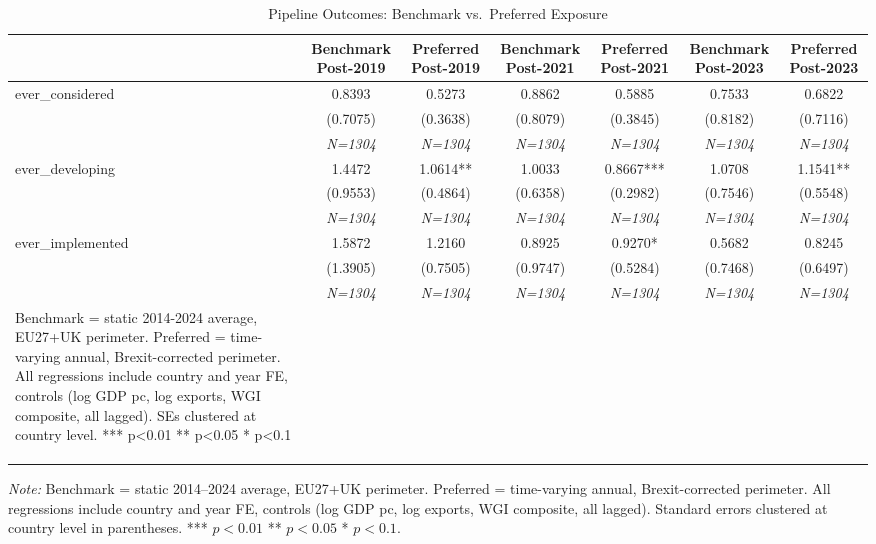 \documentclass[12pt,a4paper]{article}
\begin{document}
\begin{table}[htbp]
\centering
\begin{threeparttable}
\caption{Pipeline Outcomes: Benchmark vs.~Preferred Exposure}\label{tab:twfe_comparison}
\small
\begin{tabular}{lcccccc}
\toprule
 & Benchmark Post-2019 & Preferred Post-2019 & Benchmark Post-2021 & Preferred Post-2021 & Benchmark Post-2023 & Preferred Post-2023 \\
\midrule
ever\_considered & 0.8393 & 0.5273 & 0.8862 & 0.5885 & 0.7533 & 0.6822 \\
 & (0.7075) & (0.3638) & (0.8079) & (0.3845) & (0.8182) & (0.7116) \\
 & \textit{N=1304} & \textit{N=1304} & \textit{N=1304} & \textit{N=1304} & \textit{N=1304} & \textit{N=1304} \\
\addlinespace
ever\_developing & 1.4472 & 1.0614** & 1.0033 & 0.8667*** & 1.0708 & 1.1541** \\
 & (0.9553) & (0.4864) & (0.6358) & (0.2982) & (0.7546) & (0.5548) \\
 & \textit{N=1304} & \textit{N=1304} & \textit{N=1304} & \textit{N=1304} & \textit{N=1304} & \textit{N=1304} \\
\addlinespace
ever\_implemented & 1.5872 & 1.2160 & 0.8925 & 0.9270* & 0.5682 & 0.8245 \\
 & (1.3905) & (0.7505) & (0.9747) & (0.5284) & (0.7468) & (0.6497) \\
 & \textit{N=1304} & \textit{N=1304} & \textit{N=1304} & \textit{N=1304} & \textit{N=1304} & \textit{N=1304} \\
\addlinespace
Benchmark = static 2014-2024 average, EU27+UK perimeter. Preferred = time-varying annual, Brexit-corrected perimeter. All regressions include country and year FE, controls (log GDP pc, log exports, WGI composite, all lagged). SEs clustered at country level. *** p<0.01  ** p<0.05  * p<0.1 &  &  &  &  &  &  \\
 &  &  &  &  &  &  \\
 &  &  &  &  &  &  \\
\addlinespace
\bottomrule
\end{tabular}
\begin{tablenotes}\small
\item \textit{Note:} Benchmark = static 2014--2024 average, EU27+UK perimeter. Preferred = time-varying annual, Brexit-corrected perimeter. All regressions include country and year FE, controls (log GDP pc, log exports, WGI composite, all lagged). Standard errors clustered at country level in parentheses. *** $p<0.01$ ** $p<0.05$ * $p<0.1$.
\end{tablenotes}
\end{threeparttable}
\end{table}
\end{document}
